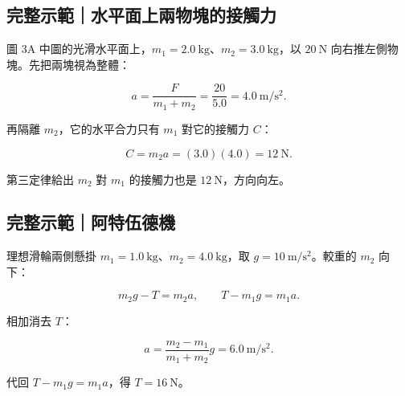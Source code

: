 \documentclass[11pt,a4paper]{article}
\begin{document}
\begin{HandoutWorkedExample}

\subsection{完整示範｜水平面上兩物塊的接觸力}\label{ux5b8cux6574ux793aux7bc4ux6c34ux5e73ux9762ux4e0aux5169ux7269ux584aux7684ux63a5ux89f8ux529b}

圖 3A 中圖的光滑水平面上，\(m_1=2.0\ \mathrm{kg}\)、\(m_2=3.0\ \mathrm{kg}\)，以 \(20\ \mathrm N\) 向右推左側物塊。先把兩塊視為整體：

\[
a=\frac{F}{m_1+m_2}
=\frac{20}{5.0}
=4.0\ \mathrm{m/s^2}.
\]

再隔離 \(m_2\)，它的水平合力只有 \(m_1\) 對它的接觸力 \(C\)：

\[
C=m_2a=(3.0)(4.0)=12\ \mathrm N.
\]

第三定律給出 \(m_2\) 對 \(m_1\) 的接觸力也是 \(12\ \mathrm N\)，方向向左。

\end{HandoutWorkedExample}

\begin{HandoutWorkedExample}

\subsection{完整示範｜阿特伍德機}\label{ux5b8cux6574ux793aux7bc4ux963fux7279ux4f0dux5fb7ux6a5f}

理想滑輪兩側懸掛 \(m_1=1.0\ \mathrm{kg}\)、\(m_2=4.0\ \mathrm{kg}\)，取 \(g=10\ \mathrm{m/s^2}\)。較重的 \(m_2\) 向下：

\[
m_2g-T=m_2a,
\qquad
T-m_1g=m_1a.
\]

相加消去 \(T\)：

\[
a=\frac{m_2-m_1}{m_1+m_2}g=6.0\ \mathrm{m/s^2}.
\]

代回 \(T-m_1g=m_1a\)，得 \(T=16\ \mathrm N\)。

\end{HandoutWorkedExample}
\end{document}
